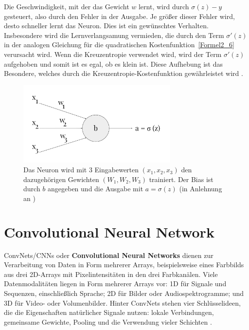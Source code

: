     Die Geschwindigkeit, mit der das Gewicht $w$ lernt, wird durch $\sigma(z) - y$ gesteuert, also durch den Fehler in der Ausgabe. Je größer dieser Fehler wird, desto schneller lernt das Neuron. Dies ist ein gewünschtes Verhalten. Insbesondere wird die Lernverlangsamung vermieden, die durch den Term $\sigma'(z)$ in der analogen Gleichung für die quadratischen Kostenfunktion~\ref{Formel2_6} verursacht wird. Wenn die Kreuzentropie verwendet wird, wird der Term $\sigma'(z)$ aufgehoben und somit ist es egal, ob es klein ist. Diese Aufhebung ist das Besondere, welches durch die Kreuzentropie-Kostenfunktion gewährleistet wird \cite[63-64]{Nielsen2015}.

    \begin{figure}[H]
        \centering
        \includegraphics[width=8cm]{kapitel2/entropie.png}
        \caption[Darstellung der Kreuzentropie am beispiel eines Neurons]{Das Neuron wird mit 3 Eingabewerten $(x_1, x_2, x_3)$ den dazugehörigen Gewichten $(W_1, W_2, W_3)$ trainiert. Der Bias ist durch $b$ angegeben und die Ausgabe mit $a = \sigma(z)$ (in Anlehnung an \cite*{Nielsen2015})}
        \label{Kap2:Entropie}
    \end{figure}

    \section{Convolutional Neural Network}

    ConvNets/CNNs oder \textbf{Convolutional Neural Networks} dienen zur Verarbeitung von Daten in Form mehrerer Arrays, beispielsweise eines Farbbilds aus drei 2D-Arrays mit Pixelintensitäten in den drei Farbkanälen. Viele Datenmodalitäten liegen in Form mehrerer Arrays vor: 1D für Signale und Sequenzen, einschließlich Sprache; 2D für Bilder oder Audiospektrogramme; und 3D für Video- oder Volumenbilder. Hinter ConvNets stehen vier Schlüsselideen, die die Eigenschaften natürlicher Signale nutzen: lokale Verbindungen, gemeinsame Gewichte, Pooling und die Verwendung vieler Schichten \cite*{Lecun2015}.



